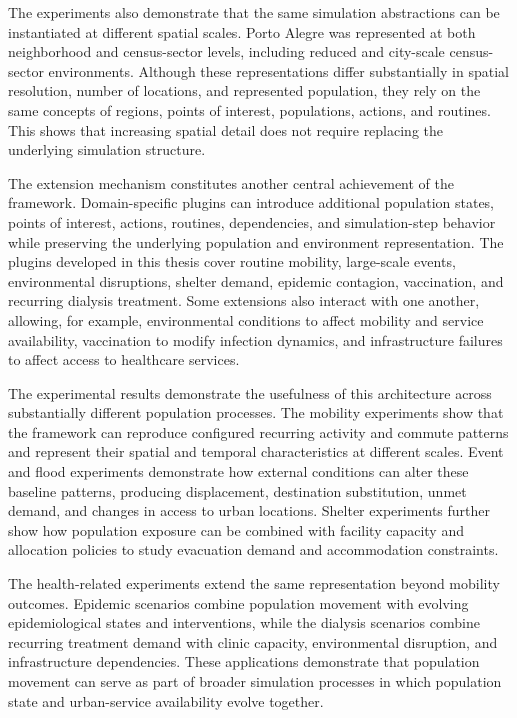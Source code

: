 The experiments also demonstrate that the same simulation abstractions can be
instantiated at different spatial scales. Porto Alegre was represented at both
neighborhood and census-sector levels, including reduced and city-scale
census-sector environments. Although these representations differ substantially in
spatial resolution, number of locations, and represented population, they rely on
the same concepts of regions, points of interest, populations, actions, and routines.
This shows that increasing spatial detail does not require replacing the underlying
simulation structure.

The extension mechanism constitutes another central achievement of the framework.
Domain-specific plugins can introduce additional population states, points of
interest, actions, routines, dependencies, and simulation-step behavior while
preserving the underlying population and environment representation. The plugins
developed in this thesis cover routine mobility, large-scale events, environmental
disruptions, shelter demand, epidemic contagion, vaccination, and recurring dialysis
treatment. Some extensions also interact with one another, allowing, for example,
environmental conditions to affect mobility and service availability, vaccination to
modify infection dynamics, and infrastructure failures to affect access to healthcare
services.

The experimental results demonstrate the usefulness of this architecture across
substantially different population processes. The mobility experiments show that the
framework can reproduce configured recurring activity and commute patterns and
represent their spatial and temporal characteristics at different scales. Event and
flood experiments demonstrate how external conditions can alter these baseline
patterns, producing displacement, destination substitution, unmet demand, and changes
in access to urban locations. Shelter experiments further show how population
exposure can be combined with facility capacity and allocation policies to study
evacuation demand and accommodation constraints.

The health-related experiments extend the same representation beyond mobility
outcomes. Epidemic scenarios combine population movement with evolving
epidemiological states and interventions, while the dialysis scenarios combine
recurring treatment demand with clinic capacity, environmental disruption, and
infrastructure dependencies. These applications demonstrate that population movement
can serve as part of broader simulation processes in which population state and
urban-service availability evolve together.

